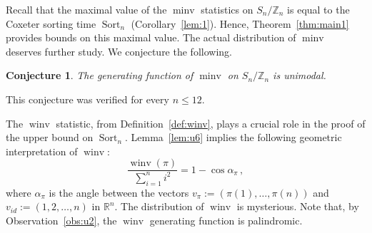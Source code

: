\documentclass[11pt]{amsart}
\newtheorem{conjecture}[theorem]{Conjecture}
\numberwithin{equation}{section}
\newcommand{\todo}[1]{\vspace{5 mm}\par \noindent
\marginpar{\textsc{ToDo}} \framebox{\begin{minipage}[c]{0.95
\textwidth}
 #1 \end{minipage}}\vspace{5 mm}\par}
\newcommand{\RR}{{\mathbb {R}}}
\newcommand{\ZZ}{{\mathbb {Z}}}
\newcommand{\minv}{{\operatorname{minv}}}
\newcommand{\winv}{{\operatorname{winv}}}
\newcommand{\Sort}{{\operatorname{Sort}}}
\begin{document}


\smallskip

Recall that the maximal value of the $\minv$ statistics on $S_n/\ZZ_n$ is equal to the Coxeter sorting time $\Sort_n$ (Corollary~\ref{lem:1}). Hence, 
Theorem~\ref{thm:main1}  provides bounds on this maximal value.
The actual distribution of $\minv$ deserves further study. We conjecture the following. 

\begin{conjecture}
    The generating function of $\minv$ on $S_n/\ZZ_n$ is unimodal.
\end{conjecture}

This conjecture 
was verified for every $n\le 12$.



\smallskip

The $\winv$ statistic, from Definition~\ref{def:winv}, 
plays a crucial role in the proof 
of the upper bound on $\Sort_n$. 
Lemma~\ref{lem:u6} implies the following geometric interpretation of $\winv$:   
\[
    \frac{\winv(\pi)}{\sum_{i=1}^n i^2} 
    = 1 - \cos \alpha_\pi\,, 
\]
where $\alpha_\pi$ is the angle between the vectors $v_\pi :=(\pi(1),\dots,\pi(n))$ and $v_{id} :=(1,2,\dots,n)$ in $\RR^n$. 
The distribution of $\winv$ is mysterious. 
Note that, by Observation~\ref{obs:u2}, the $\winv$ generating function is palindromic. 

\medskip 
\end{document}
